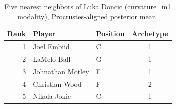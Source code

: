 \begin{table}[htbp]
  \centering\small
  \begin{tabular}{rllc}
    \toprule
    Rank & Player & Position & Archetype \\
    \midrule
    1 & Joel Embiid & C & 1 \\
    2 & LaMelo Ball & G & 1 \\
    3 & Johnathan Motley & F & 1 \\
    4 & Christian Wood & F & 2 \\
    5 & Nikola Jokic & C & 1 \\
    \bottomrule
  \end{tabular}
  \caption{Five nearest neighbors of Luka Doncic (curvature_m1 modality), Procrustes-aligned posterior mean.}
  \label{tab:Luka_Doncic_neighbors_curvature_m1}
\end{table}


